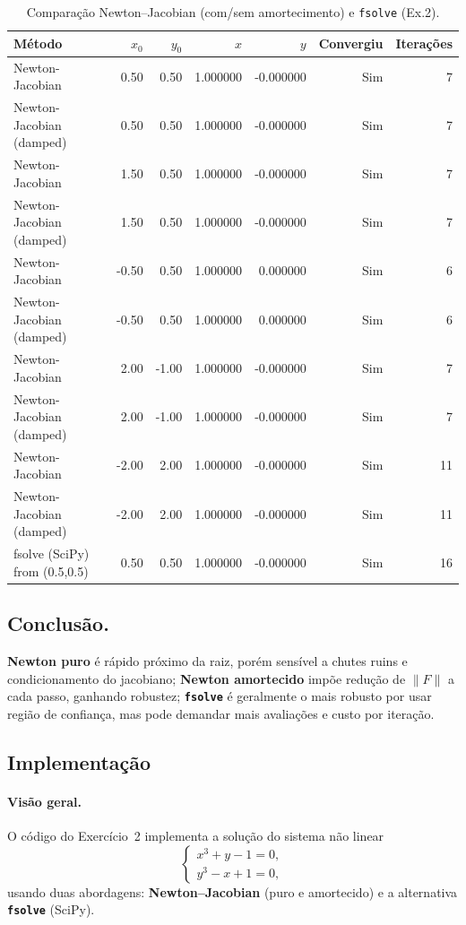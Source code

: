 \documentclass[12pt,a4paper]{article}
\begin{document}
\begin{table}[H]
\centering
\caption{Comparação Newton--Jacobian (com/sem amortecimento) e \texttt{fsolve} (Ex.2).}
\label{tab:ex2_methods}
\begin{tabular}{l r r r r r r}
\hline
Método & $x_0$ & $y_0$ & $x$ & $y$ & Convergiu & Iterações \\
\hline
Newton-Jacobian & 0.50 & 0.50 & 1.000000 & -0.000000 & Sim & 7 \\ 
Newton-Jacobian (damped) & 0.50 & 0.50 & 1.000000 & -0.000000 & Sim & 7 \\ 
Newton-Jacobian & 1.50 & 0.50 & 1.000000 & -0.000000 & Sim & 7 \\ 
Newton-Jacobian (damped) & 1.50 & 0.50 & 1.000000 & -0.000000 & Sim & 7 \\ 
Newton-Jacobian & -0.50 & 0.50 & 1.000000 & 0.000000 & Sim & 6 \\ 
Newton-Jacobian (damped) & -0.50 & 0.50 & 1.000000 & 0.000000 & Sim & 6 \\ 
Newton-Jacobian & 2.00 & -1.00 & 1.000000 & -0.000000 & Sim & 7 \\ 
Newton-Jacobian (damped) & 2.00 & -1.00 & 1.000000 & -0.000000 & Sim & 7 \\ 
Newton-Jacobian & -2.00 & 2.00 & 1.000000 & -0.000000 & Sim & 11 \\ 
Newton-Jacobian (damped) & -2.00 & 2.00 & 1.000000 & -0.000000 & Sim & 11 \\ 
fsolve (SciPy) from (0.5,0.5) & 0.50 & 0.50 & 1.000000 & -0.000000 & Sim & 16 \\
\hline
\end{tabular}
\end{table}

\subsection{Conclusão.}
\textbf{Newton puro} é rápido próximo da raiz, porém sensível a chutes ruins e condicionamento do jacobiano; 
\textbf{Newton amortecido} impõe redução de $\|F\|$ a cada passo, ganhando robustez; 
\textbf{\texttt{fsolve}} é geralmente o mais robusto por usar região de confiança, mas pode demandar mais avaliações e custo por iteração.

\subsection{Implementação}
\label{subsec:ex2-implementacao}

\paragraph{Visão geral.}
O código do Exercício~2 implementa a solução do sistema não linear
\[
\begin{cases}
x^3 + y - 1 = 0,\\
y^3 - x + 1 = 0,
\end{cases}
\]
usando duas abordagens: \textbf{Newton–Jacobian} (puro e amortecido) e a alternativa \textbf{\texttt{fsolve}} (SciPy).
\end{document}
